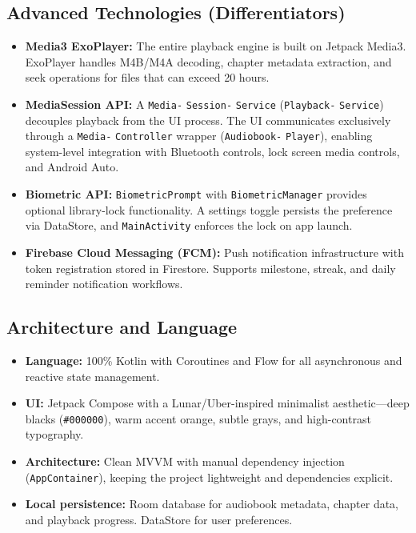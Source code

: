\documentclass[11pt,a4paper]{article}
\begin{document}
\subsection{Advanced Technologies (Differentiators)}

\begin{itemize}[noitemsep]
    \item \textbf{Media3 ExoPlayer:} The entire playback engine is built on Jetpack Media3. ExoPlayer handles M4B/M4A decoding, chapter metadata extraction, and seek operations for files that can exceed 20 hours.
    \item \textbf{MediaSession API:} A \texttt{Media-} \texttt{Session-} \texttt{Service} (\texttt{Playback-} \texttt{Service}) decouples playback from the UI process. The UI communicates exclusively through a \texttt{Media-} \texttt{Controller} wrapper (\texttt{Audiobook-} \texttt{Player}), enabling system-level integration with Bluetooth controls, lock screen media controls, and Android Auto.
    \item \textbf{Biometric API:} \texttt{BiometricPrompt} with \texttt{BiometricManager} provides optional library-lock functionality. A settings toggle persists the preference via DataStore, and \texttt{MainActivity} enforces the lock on app launch.
    \item \textbf{Firebase Cloud Messaging (FCM):} Push notification infrastructure with token registration stored in Firestore. Supports milestone, streak, and daily reminder notification workflows.
\end{itemize}

\subsection{Architecture and Language}

\begin{itemize}[noitemsep]
    \item \textbf{Language:} 100\% Kotlin with Coroutines and Flow for all asynchronous and reactive state management.
    \item \textbf{UI:} Jetpack Compose with a Lunar/Uber-inspired minimalist aesthetic---deep blacks (\texttt{\#000000}), warm accent orange, subtle grays, and high-contrast typography.
    \item \textbf{Architecture:} Clean MVVM with manual dependency injection (\texttt{AppContainer}), keeping the project lightweight and dependencies explicit.
    \item \textbf{Local persistence:} Room database for audiobook metadata, chapter data, and playback progress. DataStore for user preferences.
\end{itemize}
\end{document}
